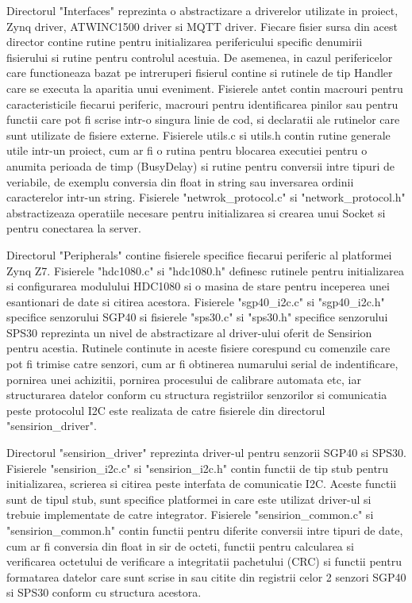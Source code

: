 Directorul "Interfaces" reprezinta o abstractizare a driverelor utilizate in proiect, Zynq driver, ATWINC1500 driver si MQTT driver. Fiecare fisier sursa din acest director 
contine rutine pentru initializarea perifericului specific denumirii fisierului si rutine pentru controlul acestuia. De asemenea, in cazul perifericelor care functioneaza 
bazat pe intreruperi fisierul contine si rutinele de tip Handler care se executa la aparitia unui eveniment. Fisierele antet contin macrouri pentru caracteristicile 
fiecarui periferic, macrouri pentru identificarea pinilor sau pentru functii care pot fi scrise intr-o singura linie de cod, si declaratii ale rutinelor care sunt 
utilizate de fisiere externe. Fisierele utils.c si utils.h contin rutine generale utile intr-un proiect, cum ar fi o rutina pentru blocarea executiei pentru o anumita 
perioada de timp (BusyDelay) si rutine pentru conversii intre tipuri de veriabile, de exemplu conversia din float in string sau inversarea ordinii caracterelor intr-un 
string. Fisierele "netwrok\_protocol.c" si "network\_protocol.h" abstractizeaza operatiile necesare pentru initializarea si crearea unui Socket si pentru conectarea 
la server.

Directorul "Peripherals" contine fisierele specifice fiecarui periferic al platformei Zynq Z7. Fisierele "hdc1080.c" si "hdc1080.h" definesc rutinele pentru initializarea 
si configurarea modulului HDC1080 si o masina de stare pentru inceperea unei esantionari de date si citirea acestora. Fisierele "sgp40\_i2c.c" si "sgp40\_i2c.h" specifice 
senzorului SGP40 si fisierele "sps30.c" si "sps30.h" specifice senzorului SPS30 reprezinta un nivel de abstractizare al driver-ului oferit de Sensirion pentru acestia. 
Rutinele continute in aceste fisiere corespund cu comenzile care pot fi trimise catre senzori, cum ar fi obtinerea numarului serial de indentificare, pornirea unei achizitii, 
pornirea procesului de calibrare automata etc, iar structurarea datelor conform cu structura registriilor senzorilor si comunicatia peste protocolul I2C este realizata de 
catre fisierele din directorul "sensirion\_driver".  

Directorul "sensirion\_driver" reprezinta driver-ul pentru senzorii SGP40 si SPS30. Fisierele "sensirion\_i2c.c" si "sensirion\_i2c.h" contin functii de tip stub pentru 
initializarea, scrierea si citirea peste interfata de comunicatie I2C. Aceste functii sunt de tipul stub, sunt specifice platformei in care este utilizat driver-ul si 
trebuie implementate de catre integrator. Fisierele "sensirion\_common.c" si "sensirion\_common.h" contin functii pentru diferite conversii intre tipuri de date, cum 
ar fi conversia din float in sir de octeti, functii pentru calcularea si verificarea octetului de verificare a integritatii pachetului (CRC) si functii pentru formatarea 
datelor care sunt scrise in sau citite din registrii celor 2 senzori SGP40 si SPS30 conform cu structura acestora.

